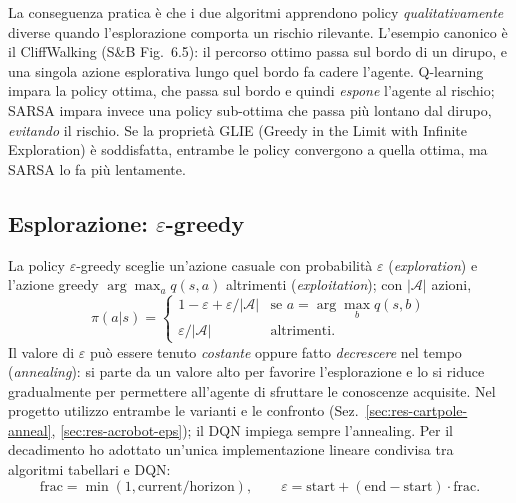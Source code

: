 La conseguenza pratica \`e che i due algoritmi apprendono policy
\emph{qualitativamente} diverse quando l'esplorazione comporta un rischio rilevante.
L'esempio canonico \`e il CliffWalking (S\&B Fig.~6.5): il percorso ottimo passa sul
bordo di un dirupo, e una singola azione esplorativa lungo quel bordo fa cadere
l'agente. Q-learning impara la policy ottima, che passa sul bordo e quindi \emph{espone}
 l'agente al rischio; SARSA impara invece una policy sub-ottima che passa pi\`u lontano dal 
 dirupo, \emph{evitando} il rischio. Se la proprietà GLIE (Greedy in the Limit with Infinite Exploration) \`e soddisfatta, entrambe le policy convergono a quella ottima, ma SARSA lo fa pi\`u lentamente.

\subsection{Esplorazione: $\varepsilon$-greedy}
La policy $\varepsilon$-greedy sceglie un'azione casuale con probabilit\`a
$\varepsilon$ (\emph{exploration}) e l'azione greedy $\arg\max_a q(s,a)$
altrimenti (\emph{exploitation}); con $|\mathcal{A}|$ azioni,
\begin{equation}
  \pi(a|s) =
  \begin{cases}
    1-\varepsilon + \varepsilon/|\mathcal{A}| & \text{se } a = \arg\max_b q(s,b)\\
    \varepsilon/|\mathcal{A}| & \text{altrimenti.}
  \end{cases}
\end{equation}
Il valore di $\varepsilon$ pu\`o essere tenuto \emph{costante} oppure fatto
\emph{decrescere} nel tempo (\emph{annealing}): si parte da un valore alto per favorire
l'esplorazione e lo si riduce gradualmente per permettere all'agente di sfruttare le
conoscenze acquisite. Nel progetto utilizzo entrambe le varianti e le confronto
(Sez.~\ref{sec:res-cartpole-anneal}, \ref{sec:res-acrobot-eps}); il DQN impiega
sempre l'annealing. Per il decadimento ho adottato un'unica implementazione lineare
condivisa tra algoritmi tabellari e DQN:
\begin{equation}
  \text{frac} = \min(1, \text{current} / \text{horizon}), \qquad
  \varepsilon = \text{start} + (\text{end} - \text{start}) \cdot \text{frac}.
\end{equation}

